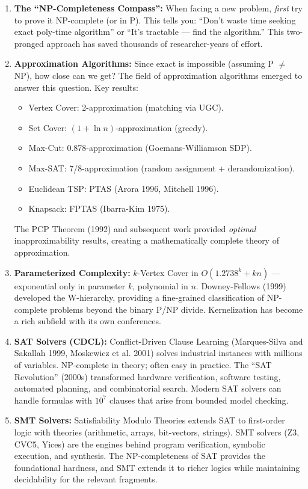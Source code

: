 \begin{enumerate}
\item \textbf{The ``NP-Completeness Compass'':} When facing a new problem, \emph{first} try to prove it NP-complete (or in P). This tells you: ``Don't waste time seeking exact poly-time algorithm'' or ``It's tractable — find the algorithm.'' This two-pronged approach has saved thousands of researcher-years of effort.

\item \textbf{Approximation Algorithms:} Since exact is impossible (assuming P $\neq$ NP), how close can we get? The field of approximation algorithms emerged to answer this question. Key results:
\begin{itemize}
\item Vertex Cover: 2-approximation (matching via UGC).
\item Set Cover: $(1 + \ln n)$-approximation (greedy).
\item Max-Cut: 0.878-approximation (Goemans-Williamson SDP).
\item Max-SAT: 7/8-approximation (random assignment + derandomization).
\item Euclidean TSP: PTAS (Arora 1996, Mitchell 1996).
\item Knapsack: FPTAS (Ibarra-Kim 1975).
\end{itemize}
The PCP Theorem (1992) and subsequent work provided \emph{optimal} inapproximability results, creating a mathematically complete theory of approximation.

\item \textbf{Parameterized Complexity:} $k$-Vertex Cover in $O(1.2738^k + kn)$ — exponential only in parameter $k$, polynomial in $n$. Downey-Fellows (1999) developed the W-hierarchy, providing a fine-grained classification of NP-complete problems beyond the binary P/NP divide. Kernelization has become a rich subfield with its own conferences.

\item \textbf{SAT Solvers (CDCL):} Conflict-Driven Clause Learning (Marques-Silva and Sakallah 1999, Moskewicz et al. 2001) solves industrial instances with millions of variables. NP-complete in theory; often easy in practice. The ``SAT Revolution'' (2000s) transformed hardware verification, software testing, automated planning, and combinatorial search. Modern SAT solvers can handle formulas with $10^7$ clauses that arise from bounded model checking.

\item \textbf{SMT Solvers:} Satisfiability Modulo Theories extends SAT to first-order logic with theories (arithmetic, arrays, bit-vectors, strings). SMT solvers (Z3, CVC5, Yices) are the engines behind program verification, symbolic execution, and synthesis. The NP-completeness of SAT provides the foundational hardness, and SMT extends it to richer logics while maintaining decidability for the relevant fragments.


\end{enumerate}
